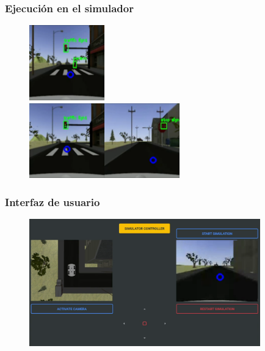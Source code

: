 \documentclass{beamer}
\begin{document}
\begin{frame}
	\frametitle{Ejecución en el simulador}
	\begin{figure}
		\centering
		\includegraphics[width=3.25cm]{figs/simRed}\\\vspace{0.5cm}
		\includegraphics[width=3.25cm]{figs/simGreen}\hspace{1cm}\includegraphics[width=3.25cm]{figs/simStop}
	\end{figure}
\end{frame}

\begin{frame}
	\frametitle{Interfaz de usuario}
	\begin{figure}
		\centering
		\includegraphics[width=10cm]{figs/GUI}
	\end{figure}
\end{frame}
\end{document}
